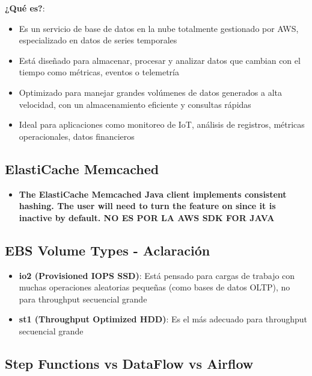 \documentclass[12pt,a4paper]{report}
\newcommand{\important}[1]{\textcolor{dangerred}{\textbf{#1}}}
\begin{document}
\textbf{¿Qué es?}:
\begin{itemize}
    \item Es un servicio de base de datos en la nube totalmente gestionado por AWS, especializado en datos de series temporales
    \item Está diseñado para almacenar, procesar y analizar datos que cambian con el tiempo como métricas, eventos o telemetría
    \item Optimizado para manejar grandes volúmenes de datos generados a alta velocidad, con un almacenamiento eficiente y consultas rápidas
    \item Ideal para aplicaciones como monitoreo de IoT, análisis de registros, métricas operacionales, datos financieros
\end{itemize}

\subsection{ElastiCache Memcached}

\begin{itemize}
    \item \important{The ElastiCache Memcached Java client implements consistent hashing. The user will need to turn the feature on since it is inactive by default. NO ES POR LA AWS SDK FOR JAVA}
\end{itemize}

\subsection{EBS Volume Types - Aclaración}

\begin{itemize}
    \item \textbf{io2 (Provisioned IOPS SSD)}: Está pensado para cargas de trabajo con muchas operaciones aleatorias pequeñas (como bases de datos OLTP), no para throughput secuencial grande
    \item \textbf{st1 (Throughput Optimized HDD)}: Es el más adecuado para throughput secuencial grande
\end{itemize}

\subsection{Step Functions vs DataFlow vs Airflow}
\end{document}
